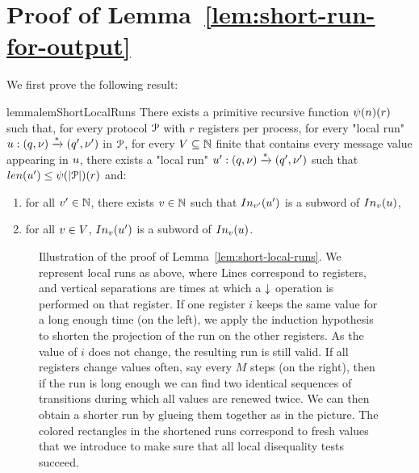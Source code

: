 \section{Proof of Lemma~\ref{lem:short-run-for-output}}
\label{app:tower-lemma}

We first prove the following result:

\begin{restatable}{lemma}{lemShortLocalRuns}
	\label{lem:short-local-runs}
	There exists a primitive recursive function $\psi(n)(r)$ such that, for every protocol $\mathcal{P}$ with $r$ registers per process, for every "local run" $u: (q, \nu) \xrightarrow{*} (q', \nu')$ in $\mathcal{P}$, for every $V \subseteq \mathbb{N}$ finite that contains every message value appearing in $u$, there exists a "local run" $u': (q, \nu) \xrightarrow{*} (q', \nu')$ such that $\length{\localrun'} \leq \towerfun(\size{\prot})(r)$ and:
	\begin{enumerate}
		\item \label{item:shorterrun_anyvalue} for all $v' \in \mathbb{N}$, there exists $v \in \mathbb{N}$ such that $\vinput{\aval'}{\localrun'}$ is a subword of $\vinput{\aval}{\localrun}$,
		\item \label{item:shorterrun_oldvalues} for all $v \in V$, $\vinput{\aval}{\localrun'}$ is a subword of $\vinput{\aval}{\localrun}$. 
	\end{enumerate}
\end{restatable}

\begin{figure}
	
	\caption{Illustration of the proof of Lemma~\ref{lem:short-local-runs}. We represent local runs as above, where Lines correspond to registers, and vertical separations are times at which a $\downarrow$ operation is performed on that register. If one register $i$ keeps the same value for a long enough time (on the left), we apply the induction hypothesis to shorten the projection of the run on the other registers. As the value of $i$ does not change, the resulting run is still valid. If all registers change values often, say every $M$ steps (on the right), then if the run is long enough we can find two identical sequences of transitions during which all values are renewed twice. We can then obtain a shorter run by glueing them together as in the picture. The colored rectangles in the shortened runs correspond to fresh values that we introduce to make sure that all local disequality tests succeed.}
\end{figure}

